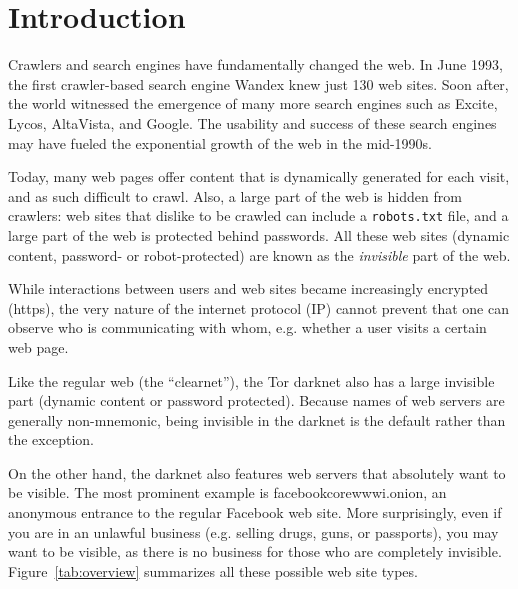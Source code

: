 \section{Introduction}

 
Crawlers and search engines have fundamentally changed the web. In June 1993, the first crawler-based search engine Wandex knew just 130 web sites. Soon after, the world witnessed the emergence of many more search engines such as 
Excite, Lycos, AltaVista, and Google. The usability and success of these search engines may have fueled the exponential growth of the web in the mid-1990s.


Today, many web pages offer content that is dynamically generated for each visit, and as such difficult to crawl. Also, a large part of the web is hidden from crawlers: web sites that dislike to be crawled can include a \texttt{robots.txt} file, and a large part of the web is protected behind passwords. All these web sites (dynamic content, password- or robot-protected) are known as the \emph{invisible} part of the web.


While interactions between users and web sites became increasingly encrypted (https), the very nature of the internet protocol (IP) cannot prevent that one can observe who is communicating with whom, e.g. whether a user visits a certain web page.





Like the regular web (the ``clearnet''), the Tor darknet also has a large invisible part (dynamic content or password protected). Because names of web servers are generally non-mnemonic, being invisible in the darknet is the default rather than the exception.



On the other hand, the darknet also features web servers that absolutely want to be visible. The most prominent example is facebookcorewwwi.onion, an anonymous entrance to the regular Facebook web site. More surprisingly, even if you are in an unlawful business (e.g. selling drugs, guns, or passports), you may want to be visible, as there is no business for those who are completely invisible. Figure~\ref{tab:overview} summarizes all these possible web site types.

